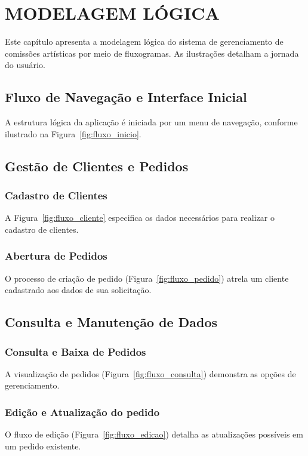 \chapter{MODELAGEM LÓGICA}
Este capítulo apresenta a modelagem lógica do sistema de gerenciamento 
de comissões artísticas por meio de fluxogramas. As ilustrações detalham 
a jornada do usuário.
\section{Fluxo de Navegação e Interface Inicial}
A estrutura lógica da aplicação é iniciada por um menu de navegação, 
conforme ilustrado na Figura~\ref{fig:fluxo_inicio}.
\section{Gestão de Clientes e Pedidos}
\subsection{Cadastro de Clientes}
A Figura~\ref{fig:fluxo_cliente} especifica os dados necessários para 
realizar o cadastro de clientes.
\subsection{Abertura de Pedidos}
O processo de criação de pedido (Figura~\ref{fig:fluxo_pedido}) atrela 
um cliente cadastrado aos dados de sua solicitação.
\section{Consulta e Manutenção de Dados}
\subsection{Consulta e Baixa de Pedidos}
A visualização de pedidos (Figura~\ref{fig:fluxo_consulta}) demonstra as 
opções de gerenciamento.
\subsection{Edição e Atualização do pedido}
O fluxo de edição (Figura~\ref{fig:fluxo_edicao}) detalha as atualizações 
possíveis em um pedido existente.
